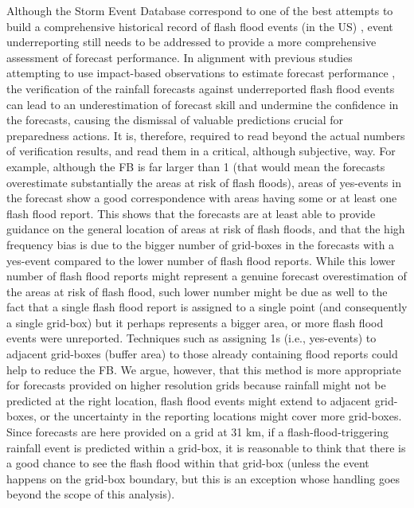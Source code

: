 Although  the Storm Event Database correspond to one of the best attempts to build a comprehensive historical record of flash flood events (in the US) , event underreporting still needs to be addressed to provide a more comprehensive assessment of forecast performance. In alignment with previous studies attempting to use impact-based observations to estimate forecast performance \citep{Hitchens_2013, Robbins_2018, Mitheu_2023, Mitheu_2025}, the verification of the rainfall forecasts against underreported flash flood events can lead to an underestimation of forecast skill and undermine the confidence in the forecasts, causing the dismissal of valuable predictions crucial for preparedness actions. It is, therefore, required to read beyond the actual numbers of verification results, and read them in a critical, although subjective, way. For example, although the FB is far larger than 1 (that would mean the forecasts overestimate substantially the areas at risk of flash floods), areas of yes-events in the forecast show a good correspondence with areas having some or at least one flash flood report. This shows that the forecasts are at least able to provide guidance on the general location of areas at risk of flash floods, and that the high frequency bias is due to the bigger number of grid-boxes in the forecasts with a yes-event compared to the lower number of flash flood reports. While this lower number of flash flood reports might represent a genuine forecast overestimation of the areas at risk of flash flood, such lower number might be due as well to the fact that a single flash flood report is assigned to a single point (and consequently a single grid-box) but it perhaps represents a bigger area, or more flash flood events were unreported. Techniques such as assigning 1s (i.e., yes-events) to adjacent grid-boxes (buffer area) to those already containing flood reports could help to reduce the FB. We argue, however, that this method is more appropriate for forecasts provided on higher resolution grids because rainfall might not be predicted at the right location, flash flood events might extend to adjacent grid-boxes, or the uncertainty in the reporting locations might cover more grid-boxes. Since forecasts are here provided on a grid at 31 km, if a flash-flood-triggering rainfall event is predicted within a grid-box, it is reasonable to think that there is a good chance to see the flash flood within that grid-box (unless the event happens on the grid-box boundary, but this is an exception whose handling goes beyond the scope of this analysis). 

